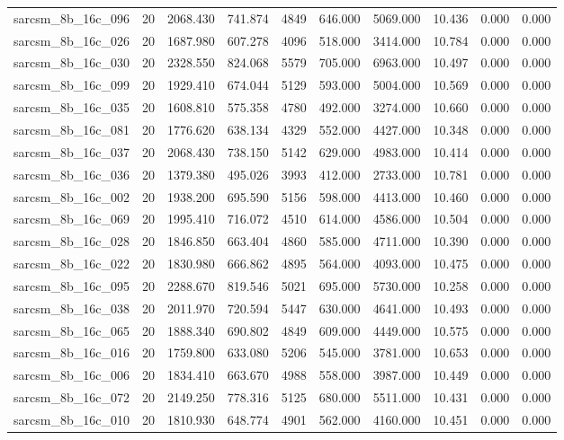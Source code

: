 \begin{tabular}{lrrrrrrrrr}
sarcsm\_8b\_16c\_096 & 20 & 2068.430 & 741.874 & 4849 & 646.000 & 5069.000 & 10.436 & 0.000 & 0.000 \\
sarcsm\_8b\_16c\_026 & 20 & 1687.980 & 607.278 & 4096 & 518.000 & 3414.000 & 10.784 & 0.000 & 0.000 \\
sarcsm\_8b\_16c\_030 & 20 & 2328.550 & 824.068 & 5579 & 705.000 & 6963.000 & 10.497 & 0.000 & 0.000 \\
sarcsm\_8b\_16c\_099 & 20 & 1929.410 & 674.044 & 5129 & 593.000 & 5004.000 & 10.569 & 0.000 & 0.000 \\
sarcsm\_8b\_16c\_035 & 20 & 1608.810 & 575.358 & 4780 & 492.000 & 3274.000 & 10.660 & 0.000 & 0.000 \\
sarcsm\_8b\_16c\_081 & 20 & 1776.620 & 638.134 & 4329 & 552.000 & 4427.000 & 10.348 & 0.000 & 0.000 \\
sarcsm\_8b\_16c\_037 & 20 & 2068.430 & 738.150 & 5142 & 629.000 & 4983.000 & 10.414 & 0.000 & 0.000 \\
sarcsm\_8b\_16c\_036 & 20 & 1379.380 & 495.026 & 3993 & 412.000 & 2733.000 & 10.781 & 0.000 & 0.000 \\
sarcsm\_8b\_16c\_002 & 20 & 1938.200 & 695.590 & 5156 & 598.000 & 4413.000 & 10.460 & 0.000 & 0.000 \\
sarcsm\_8b\_16c\_069 & 20 & 1995.410 & 716.072 & 4510 & 614.000 & 4586.000 & 10.504 & 0.000 & 0.000 \\
sarcsm\_8b\_16c\_028 & 20 & 1846.850 & 663.404 & 4860 & 585.000 & 4711.000 & 10.390 & 0.000 & 0.000 \\
sarcsm\_8b\_16c\_022 & 20 & 1830.980 & 666.862 & 4895 & 564.000 & 4093.000 & 10.475 & 0.000 & 0.000 \\
sarcsm\_8b\_16c\_095 & 20 & 2288.670 & 819.546 & 5021 & 695.000 & 5730.000 & 10.258 & 0.000 & 0.000 \\
sarcsm\_8b\_16c\_038 & 20 & 2011.970 & 720.594 & 5447 & 630.000 & 4641.000 & 10.493 & 0.000 & 0.000 \\
sarcsm\_8b\_16c\_065 & 20 & 1888.340 & 690.802 & 4849 & 609.000 & 4449.000 & 10.575 & 0.000 & 0.000 \\
sarcsm\_8b\_16c\_016 & 20 & 1759.800 & 633.080 & 5206 & 545.000 & 3781.000 & 10.653 & 0.000 & 0.000 \\
sarcsm\_8b\_16c\_006 & 20 & 1834.410 & 663.670 & 4988 & 558.000 & 3987.000 & 10.449 & 0.000 & 0.000 \\
sarcsm\_8b\_16c\_072 & 20 & 2149.250 & 778.316 & 5125 & 680.000 & 5511.000 & 10.431 & 0.000 & 0.000 \\
sarcsm\_8b\_16c\_010 & 20 & 1810.930 & 648.774 & 4901 & 562.000 & 4160.000 & 10.451 & 0.000 & 0.000 \\

\end{tabular}
